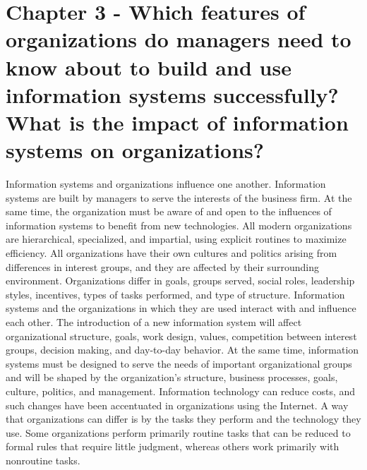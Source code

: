 \documentclass[12pt]{article}
\begin{document}
\section{Chapter 3 - Which features of organizations do managers need to know about to build and use
information systems successfully? What is the impact of information systems on
organizations?}
Information systems and organizations influence one another. Information systems are built by managers to serve the interests of the business firm. At the same time, the organization must be aware of and open to the influences of information systems to benefit from new technologies. All modern organizations are hierarchical, specialized, and impartial, using explicit routines to maximize efficiency. All organizations have their own cultures and politics arising from differences in interest groups, and they are affected by their surrounding environment. Organizations differ in goals,
groups served, social roles, leadership styles, incentives, types of tasks performed, and type of structure. Information systems and the organizations in which they are used interact with and influence each
other. The introduction of a new information system will affect organizational structure, goals, work
design, values, competition between interest groups, decision making, and day-to-day behavior. At the
same time, information systems must be designed to serve the needs of important organizational groups
and will be shaped by the organization’s structure, business processes, goals, culture, politics, and
management. Information technology can reduce costs, and such changes have been accentuated in organizations using the Internet. 
A way that organizations can differ is by the tasks they perform and the technology they use. Some organizations perform primarily routine tasks that can be reduced to formal rules that require little judgment, whereas others work primarily with nonroutine tasks.
\end{document}
